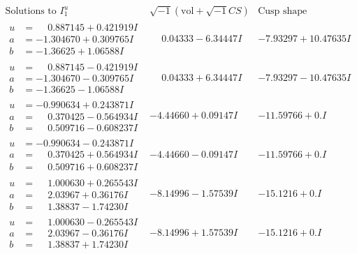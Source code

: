 \documentclass[1p]{elsarticle_modified}
\theoremstyle{definition}
\newcommand{\I}{\sqrt{-1}}
\begin{document}
$$\begin{array}{c|c|c}  
\text{Solutions to }I^u_{1}& \I (\text{vol} + \sqrt{-1}CS) & \text{Cusp shape}\\
 \hline 
\begin{aligned}
u &= \phantom{-}0.887145 + 0.421919 I \\
a &= -1.304670 + 0.309765 I \\
b &= -1.36625 + 1.06588 I\end{aligned}
 & \phantom{-}0.04333 - 6.34447 I & -7.93297 + 10.47635 I \\ \hline\begin{aligned}
u &= \phantom{-}0.887145 - 0.421919 I \\
a &= -1.304670 - 0.309765 I \\
b &= -1.36625 - 1.06588 I\end{aligned}
 & \phantom{-}0.04333 + 6.34447 I & -7.93297 - 10.47635 I \\ \hline\begin{aligned}
u &= -0.990634 + 0.243871 I \\
a &= \phantom{-}0.370425 - 0.564934 I \\
b &= \phantom{-}0.509716 - 0.608237 I\end{aligned}
 & -4.44660 + 0.09147 I & -11.59766 + 0. I\phantom{ +0.000000I} \\ \hline\begin{aligned}
u &= -0.990634 - 0.243871 I \\
a &= \phantom{-}0.370425 + 0.564934 I \\
b &= \phantom{-}0.509716 + 0.608237 I\end{aligned}
 & -4.44660 - 0.09147 I & -11.59766 + 0. I\phantom{ +0.000000I} \\ \hline\begin{aligned}
u &= \phantom{-}1.000630 + 0.265543 I \\
a &= \phantom{-}2.03967 + 0.36176 I \\
b &= \phantom{-}1.38837 - 1.74230 I\end{aligned}
 & -8.14996 - 1.57539 I & -15.1216 + 0. I\phantom{ +0.000000I} \\ \hline\begin{aligned}
u &= \phantom{-}1.000630 - 0.265543 I \\
a &= \phantom{-}2.03967 - 0.36176 I \\
b &= \phantom{-}1.38837 + 1.74230 I\end{aligned}
 & -8.14996 + 1.57539 I & -15.1216 + 0. I\phantom{ +0.000000I} \\ \hline\begin{aligned}

\end{aligned}
\end{array}$$
\end{document}
